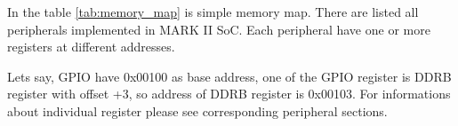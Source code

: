In the table \ref{tab:memory_map} is simple memory map. There are listed all
peripherals implemented in MARK II SoC. Each peripheral have one or more registers at different
addresses.

Lets say, GPIO have 0x00100 as base address, one of the GPIO register
is DDRB register with offset +3, so address of DDRB register is 0x00103. For
informations about individual register please see corresponding peripheral sections.
